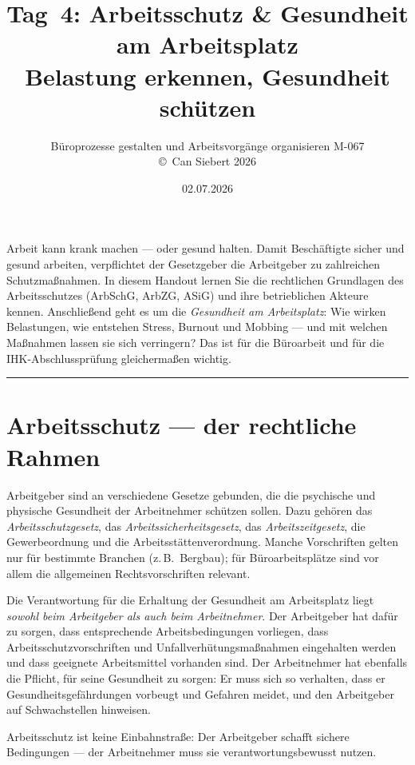 \documentclass[11pt, a4paper]{article}
\title{\vspace*{-1.5cm}\Huge\bfseries\color{bfwPrimaryDark}Tag~4: Arbeitsschutz \& Gesundheit am Arbeitsplatz\\[0.4em]
  \large\color{bfwInkSoft}\textnormal{Belastung erkennen, Gesundheit schützen}}
\author{\textsf{Büroprozesse gestalten und Arbeitsvorgänge organisieren \textperiodcentered{} M-067}\\
\textsf{\small\copyright\ Can Siebert\,\textperiodcentered\,2026}}
\date{02.07.2026}
\begin{document}
\maketitle
\thispagestyle{empty}

\vspace{1em}
\begin{merksatz}[title={\bfseries Worum geht es heute?}]
Arbeit kann krank machen --- oder gesund halten. Damit Beschäftigte sicher und gesund
arbeiten, verpflichtet der Gesetzgeber die Arbeitgeber zu zahlreichen Schutzmaßnahmen.
In diesem Handout lernen Sie die rechtlichen Grundlagen des Arbeitsschutzes
(ArbSchG, ArbZG, ASiG) und ihre betrieblichen Akteure kennen. Anschließend geht es um
die \emph{Gesundheit am Arbeitsplatz}: Wie wirken Belastungen, wie entstehen Stress,
Burnout und Mobbing --- und mit welchen Maßnahmen lassen sie sich verringern? Das ist
für die Büroarbeit und für die IHK-Abschlussprüfung gleichermaßen wichtig.
\end{merksatz}

\tableofcontents
\vspace{1em}
\hrule
\vspace{1em}

\section{Arbeitsschutz --- der rechtliche Rahmen}

Arbeitgeber sind an verschiedene Gesetze gebunden, die die psychische und physische
Gesundheit der Arbeitnehmer schützen sollen. Dazu gehören das \emph{Arbeitsschutzgesetz},
das \emph{Arbeitssicherheitsgesetz}, das \emph{Arbeitszeitgesetz}, die Gewerbeordnung und
die Arbeitsstättenverordnung. Manche Vorschriften gelten nur für bestimmte Branchen
(z.\,B.\ Bergbau); für Büroarbeitsplätze sind vor allem die allgemeinen Rechtsvorschriften
relevant.

Die Verantwortung für die Erhaltung der Gesundheit am Arbeitsplatz liegt \emph{sowohl beim
Arbeitgeber als auch beim Arbeitnehmer}. Der Arbeitgeber hat dafür zu sorgen, dass
entsprechende Arbeitsbedingungen vorliegen, dass Arbeitsschutzvorschriften und
Unfallverhütungsmaßnahmen eingehalten werden und dass geeignete Arbeitsmittel vorhanden
sind. Der Arbeitnehmer hat ebenfalls die Pflicht, für seine Gesundheit zu sorgen: Er muss
sich so verhalten, dass er Gesundheitsgefährdungen vorbeugt und Gefahren meidet, und den
Arbeitgeber auf Schwachstellen hinweisen.

\begin{merksatz}
Arbeitsschutz ist keine Einbahnstraße: Der Arbeitgeber schafft sichere Bedingungen ---
der Arbeitnehmer muss sie verantwortungsbewusst nutzen.
\end{merksatz}
\end{document}
